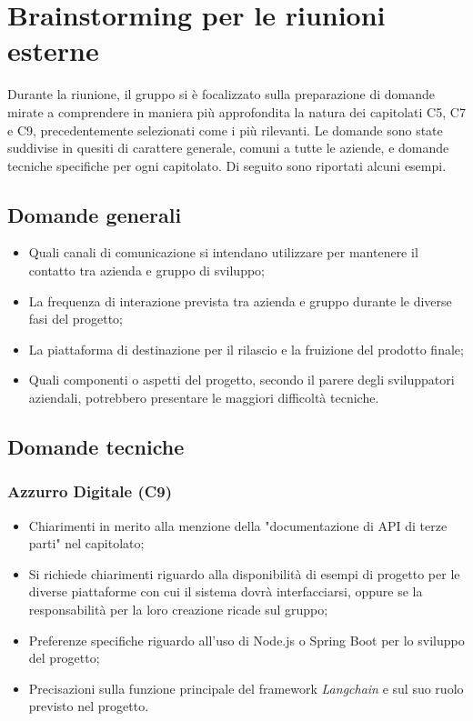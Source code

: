 \documentclass[a4paper, 12pt]{article}
\begin{document}
\section{Brainstorming per le riunioni esterne}
Durante la riunione, il gruppo si è focalizzato sulla preparazione di domande mirate a comprendere in maniera più approfondita la natura dei capitolati C5, C7 e C9, precedentemente selezionati come i più rilevanti. Le domande sono state suddivise in quesiti di carattere generale, comuni a tutte le aziende, e domande tecniche specifiche per ogni capitolato. Di seguito sono riportati alcuni esempi.

\subsection{Domande generali}
\begin{itemize}
    \item Quali canali di comunicazione si intendano utilizzare per mantenere il contatto tra azienda e gruppo di sviluppo;
    \item La frequenza di interazione prevista tra azienda e gruppo durante le diverse fasi del progetto;
    \item La piattaforma di destinazione per il rilascio e la fruizione del prodotto finale;
    \item Quali componenti o aspetti del progetto, secondo il parere degli sviluppatori aziendali, potrebbero presentare le maggiori difficoltà tecniche.
\end{itemize}

\subsection{Domande tecniche}
\subsubsection{Azzurro Digitale (C9)}
\begin{itemize}
    \item Chiarimenti in merito alla menzione della "documentazione di API di terze parti" nel capitolato;
    \item Si richiede chiarimenti riguardo alla disponibilità di esempi di progetto per le diverse piattaforme con cui il sistema dovrà interfacciarsi, oppure se la responsabilità per la loro creazione ricade sul gruppo;
    \item Preferenze specifiche riguardo all'uso di Node.js o Spring Boot per lo sviluppo del progetto;
    \item Precisazioni sulla funzione principale del framework \textit{Langchain} e sul suo ruolo previsto nel progetto.
\end{itemize}
\end{document}
